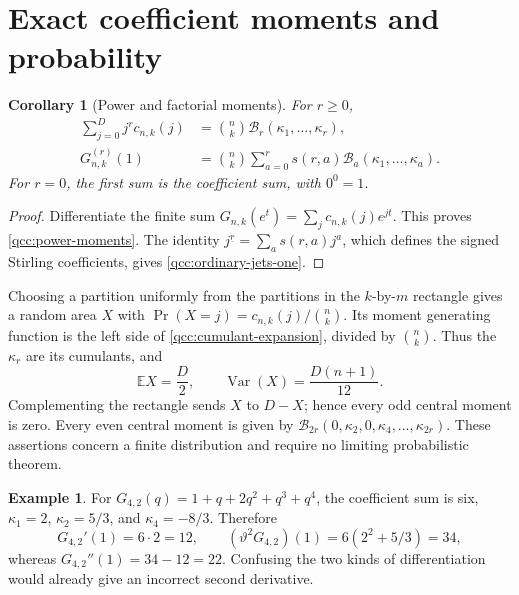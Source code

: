 \documentclass[11pt,a4paper,oneside,openany]{book}
\newtheorem{corollary}[theorem]{Corollary}
\theoremstyle{definition}
\newtheorem{example}[theorem]{Example}
\theoremstyle{remark}
\newcommand{\Y}[1]{\mathcal B_{#1}}
\DeclareMathOperator{\Var}{Var}
\newcommand{\E}{\mathbb E}
\newcommand{\logq}{\vartheta}
\begin{document}
\section{Exact coefficient moments and probability}
\begin{corollary}[Power and factorial moments]\label{qcc:moment-formulas}
For \(r\ge0\),
\begin{align}
 \sum_{j=0}^{D}j^r c_{n,k}(j)
 &=\binom nk\Y r(\kappa_1,\ldots,\kappa_r),
       \label{qcc:power-moments}\\
 G_{n,k}^{(r)}(1)
 &=\binom nk\sum_{a=0}^r s(r,a)
           \Y a(\kappa_1,\ldots,\kappa_a).
       \label{qcc:ordinary-jets-one}
\end{align}
For \(r=0\), the first sum is the coefficient sum, with \(0^0=1\).
\end{corollary}
\begin{proof}
Differentiate the finite sum \(G_{n,k}(e^t)=\sum_jc_{n,k}(j)e^{jt}\).
This proves \eqref{qcc:power-moments}. The identity
\(j^{\underline r}=\sum_a s(r,a)j^a\), which defines the signed
Stirling coefficients, gives \eqref{qcc:ordinary-jets-one}.
\end{proof}

Choosing a partition uniformly from the partitions in the \(k\)-by-\(m\)
rectangle gives a random area \(X\) with
\(\Pr(X=j)=c_{n,k}(j)/\binom nk\). Its moment generating function is the
left side of \eqref{qcc:cumulant-expansion}, divided by \(\binom nk\).
Thus the \(\kappa_r\) are its cumulants, and
\begin{equation}\label{qcc:area-statistics}
 \E X=\frac D2,\qquad \Var(X)=\frac{D(n+1)}{12}.
\end{equation}
Complementing the rectangle sends \(X\) to \(D-X\); hence every odd
central moment is zero. Every even central moment is given by
\(\Y{2r}(0,\kappa_2,0,\kappa_4,\ldots,\kappa_{2r})\).
These assertions concern a finite distribution and require no limiting
probabilistic theorem.

\begin{example}
For \(G_{4,2}(q)=1+q+2q^2+q^3+q^4\), the coefficient sum is six,
\(\kappa_1=2\), \(\kappa_2=5/3\), and \(\kappa_4=-8/3\).
Therefore
\[
 G_{4,2}'(1)=6\cdot2=12,\qquad
 (\logq^2G_{4,2})(1)=6(2^2+5/3)=34,
\]
whereas
\(G_{4,2}''(1)=34-12=22\). Confusing the two kinds of differentiation
would already give an incorrect second derivative.
\end{example}
\end{document}
